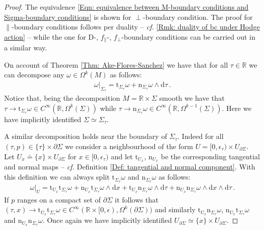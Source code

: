 \begin{proof}
	The equivalence \eqref{Eqn: equivalence between M-boundary conditions and Sigma-boundary conditions} is shown for $\perp$-boundary condition.
	The proof for $\parallel$-boundary conditions follows per duality -- \textit{cf.} \eqref{Rmk: duality of bc under Hodge action} -- while the one for $\mathrm{D}$-, $f_\parallel$-, $f_\perp$-boundary conditions can be carried out in a similar way.
	
	On account of Theorem \ref{Thm: Ake-Flores-Sanchez} we have that for all $\tau\in\mathbb{R}$ we can decompose any $\omega\in\Omega^k(M)$ as follows:
	\begin{align*}
	\omega|_{\Sigma_\tau}=
	\mathrm{t}_{\Sigma_\tau}\omega+
	\mathrm{n}_{\Sigma_\tau}\omega\wedge\mathrm{d}\tau\,.
	\end{align*}
	Notice that, being the decomposition $M=\mathbb{R}\times\Sigma$ smooth we have that $\tau\to\mathrm{t}_{\Sigma_\tau}\omega \in C^\infty(\mathbb{R},\Omega^k(\Sigma))$ while $\tau\to\mathrm{n}_{\Sigma_\tau}\omega \in C^\infty(\mathbb{R},\Omega^{k-1}(\Sigma))$. Here we have implicitly identified $\Sigma\simeq\Sigma_\tau$.
	
	A similar decomposition holds near the boundary of $\Sigma_\tau$. Indeed for all $(\tau,p)\in\{\tau\}\times\partial\Sigma$ we consider a neighbourhood of the form $U=[0,\epsilon_\tau)\times U_{\partial\Sigma}$.
	Let $U_x\doteq\{x\}\times U_{\partial\Sigma}$ for $x\in [0,\epsilon_\tau)$ and let $\mathrm{t}_{U_x}$, $\mathrm{n}_{U_x}$ be the corresponding tangential and normal maps -- \textit{cf.} Definition \ref{Def: tangential and normal component}.
	With this definition we can always split $\mathrm{t}_{\Sigma_\tau}\omega$ and $\mathrm{n}_{\Sigma_\tau}\omega$ as follows:
	\begin{align}
	\omega|_{U}=
	\mathrm{t}_{U_x}\mathrm{t}_{\Sigma_\tau}\omega+
	\mathrm{n}_{U_x}\mathrm{t}_{\Sigma_\tau}\omega\wedge\mathrm{d}x+
	\mathrm{t}_{U_x}\mathrm{n}_{\Sigma_\tau}\omega\wedge\mathrm{d}\tau+
	\mathrm{n}_{U_x}\mathrm{n}_{\Sigma_\tau}\omega\wedge\mathrm{d}x\wedge\mathrm{d}\tau\,.
	\end{align}
	If $p$ ranges on a compact set of $\partial\Sigma$ it follows that $(\tau,x)\to\mathrm{t}_{U_x}\mathrm{t}_{\Sigma_\tau}\omega\in C^\infty(\mathbb{R}\times[0,\epsilon),\Omega^k(\partial\Sigma))$ and similarly $\mathrm{t}_{U_x}\mathrm{n}_{\Sigma_\tau}\omega$, $\mathrm{n}_{U_x}\mathrm{t}_{\Sigma_\tau}\omega$ and $\mathrm{n}_{U_x}\mathrm{n}_{\Sigma_\tau}\omega$. Once again we have implicitly identified $U_{\partial\Sigma}\simeq\{x\}\times U_{\partial\Sigma}$.
	

\end{proof}
